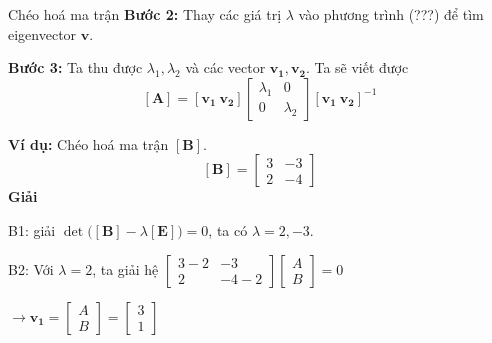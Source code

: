 \begin{frame}{Chéo hoá ma trận}
    \textbf{Bước 2:} Thay các giá trị \(\lambda\) vào phương trình (???) để tìm eigenvector \(\mathbf{v}\).
    \vspace{2mm}

    \textbf{Bước 3:} Ta thu được \(\lambda_1, \lambda_2\) và các vector \(\mathbf{v_1}, \mathbf{v_2}\). Ta sẽ viết được
    \begin{equation}
        \mathbf{[A]} = \left[\mathbf{v_1} \ \mathbf{v_2}\right] 
        \left[
        \begin{array}{cc}
        \lambda_1 & 0 \\
        0 & \lambda_2 
        \end{array}
        \right] \left[\mathbf{v_1} \ \mathbf{v_2}\right]^{-1}
        \label{3.4_5}
    \end{equation}
    \begin{center}
        \begin{minipage}{0.45\linewidth}
            \textbf{Ví dụ:} Chéo hoá ma trận \(\mathbf{[B]}\).
            \begin{equation*}
                \mathbf{[B]} = 
                \left[
                \begin{array}{cc}
                    3 & -3 \\
                    2 & -4
                \end{array}
                \right]
            \end{equation*}
            \pause
            \textbf{Giải}

            B1: giải \(\det \Big(\mathbf{[B]} - \lambda \mathbf{[E]} \Big)=0\), ta có \(\lambda = 2,-3\).
        \end{minipage}
        \hspace{5mm}
        \begin{minipage}{0.45\linewidth}
            B2: Với \(\lambda = 2\), ta giải hệ \(\left[
            \begin{array}{cc}
                3 - 2 & -3 \\
                2 & -4 -2
            \end{array}\right] \left[
            \begin{array}{c}
            A \\
            B
            \end{array}\right] = 0\)
            \vspace{2mm}

            \(\rightarrow \mathbf{v_1} = \left[
            \begin{array}{c}
            A \\
            B
            \end{array}\right] = \left[
            \begin{array}{c}
            3 \\
            1
            \end{array}\right] \)
        \end{minipage}
    \end{center}
\end{frame}
